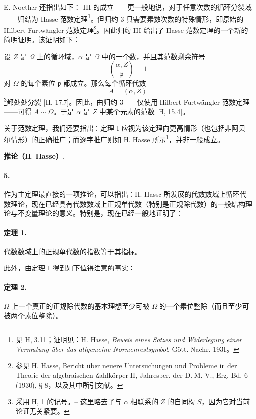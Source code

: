 
E. Noether 还指出如下：
III 的成立——更一般地说，对于任意次数的循环分裂域——归结为 Hasse 范数定理\footnote{\label{fn:p38-hasse-normensatz}见 H, 3.11；证明见：H. Hasse, \emph{Beweis eines Satzes und Widerlegung einer Vermutung über das allgemeine Normenrestsymbol}, Gött. Nachr. 1931。}。但归约 3 只需要素数次数的特殊情形，即原始的 Hilbert-Furtwängler 范数定理\footnote{参见 H. Hasse, Bericht über neuere Untersuchungen und Probleme in der Theorie der algebraischen Zahlkörper II, Jahresber. der D. M.-V., Erg.-Bd. 6 (1930), § 8，以及其中所引文献。}。因此归约 III 给出了 Hasse 范数定理的一个新的简明证明。该证明如下：

设 \(Z\) 是 \(\Omega\) 上的循环域，\(\alpha\) 是 \(\Omega\) 中的一个数，并且其范数剩余符号
\[
\left(\frac{\alpha,Z}{\mathfrak p}\right)=1
\]
对 \(\Omega\) 的每个素位 \(\mathfrak p\) 都成立。那么每个循环代数
\[
A=(\alpha,Z)
\]
\footnote{\label{fn:p38-hasse-notation}采用 H, 1 的记号。-- 这里略去了与 \(\alpha\) 相联系的 \(Z\) 的自同构 \(S\)，因为它对当前论证无关紧要。}都处处分裂 [H, 17.7]。因此，由归约 3——仅使用 Hilbert-Furtwängler 范数定理——可得 \(A\sim\Omega\)。于是 \(\alpha\) 是 \(Z\) 中某个元素的范数 [H, 15.4]。

关于范数定理，我们还要指出：定理 I 应视为该定理向更高情形（也包括非阿贝尔情形）的正确推广；而逐字推广则如 H. Hasse 所示\textsuperscript{\ref{fn:p38-hasse-normensatz}}，并非一般成立。

\begin{center}
\textbf{推论（H. Hasse）.}
\end{center}

\paragraph{5.}
作为主定理最直接的一项推论，可以指出：H. Hasse 所发展的代数数域上循环代数理论，现在已经具有代数数域上正规单代数（特别是正规除代数）的一般结构理论与不变量理论的意义。特别是，现在已经一般地证明了：

\paragraph{定理 1.}
代数数域上的正规单代数的指数等于其指标。

此外，由定理 I 得到如下值得注意的事实：

\paragraph{定理 2.}
\(\Omega\) 上一个真正的正规除代数的基本理想至少可被 \(\Omega\) 的一个素位整除（而且至少可被两个素位整除）。

